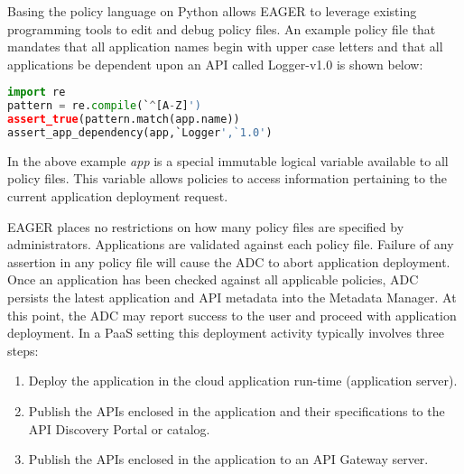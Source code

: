 
Basing the policy language on Python allows EAGER to leverage
existing programming tools to edit and debug policy files. An example policy
file that mandates that all application names begin with upper case letters and
that all applications be dependent upon an API called Logger-v1.0 is shown
below:

{\footnotesize
\begin{lstlisting}[language=Python, frame=single]
import re
pattern = re.compile(`^[A-Z]')
assert_true(pattern.match(app.name))
assert_app_dependency(app,`Logger',`1.0')
\end{lstlisting}
}

In the above example \textit{app} is a special immutable logical variable available to
all policy files. This variable allows policies to access information
pertaining to the current application deployment request. 

EAGER places no restrictions on how many policy files are specified by 
administrators. Applications are validated against each policy file. Failure
of any assertion in any policy file will cause the ADC to abort 
application deployment. Once an application has been checked against all
applicable policies, ADC persists the latest application and API metadata into
the Metadata Manager.  At this point, the ADC may report success to the user
and proceed with application deployment. In a PaaS setting
this deployment activity typically involves three steps:

\begin{enumerate}
\item Deploy the application in the cloud application run-time (application server).
\item Publish the APIs enclosed in the application and their specifications to
the API Discovery Portal or catalog.
\item Publish the APIs enclosed in the application to an API Gateway server.
\end{enumerate}

